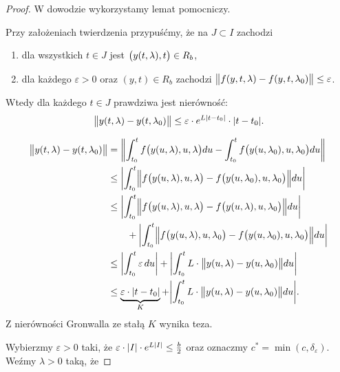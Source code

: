 \begin{proof}
  W dowodzie wykorzystamy lemat pomocniczy.
%
  \begin{nestedlemma} \label{L: Kluczowy}
%
    Przy założeniach twierdzenia przypuśćmy, że na $J \subset I$ zachodzi
%
    \begin{enumerate}
      \item dla wszystkich $t \in J$ jest $\p[\big]{y(t,\lambda),t} \in R_b$,
      \item dla każdego $\varepsilon > 0$ oraz $(y,t) \in R_b$ zachodzi
      $ \norm[\big]{ f(y,t,\lambda) - f(y,t,\lambda_0) } \leq \varepsilon $.
    \end{enumerate}
%
    Wtedy dla każdego $t \in J$ prawdziwa jest nierówność:
%
    \begin{equation*}
      \norm[\big]{ y(t,\lambda) - y(t,\lambda_0) } \leq \varepsilon \cdot e^{L \abs{t-t_0}} \cdot \abs{t-t_0}.
    \end{equation*}
%
  \end{nestedlemma}
%
  \begin{nestedproof}
%
    \begin{align*}
      \norm[\big]{ y(t,\lambda) - y(t,\lambda_0) }
      &= \norm*{ \int_{t_0}^t f \p[\big]{ y(u, \lambda), u, \lambda } du - 
          \int_{t_0}^t f\p[\big]{ y(u,\lambda_0), u, \lambda_0 } du} \\
      &\leq \abs*{ \int_{t_0}^t \norm[\Big]{ f \p[\big]{ y(u,\lambda), u, \lambda } - 
          f\p[\big]{ y(u,\lambda_0), u, \lambda_0 } } du } \\
      &\leq \abs*{ \int_{t_0}^t \norm[\Big]{ f \p[\big]{ y(u,\lambda), u, \lambda } - 
          f\p[\big]{ y(u,\lambda), u, \lambda_0 } } du } \\
      &\qquad+ \abs*{ \int_{t_0}^t \norm[\Big]{ f \p[\big]{ y(u,\lambda), u, \lambda_0 } - 
          f\p[\big]{ y(u,\lambda_0), u, \lambda_0 } } du } \\
      &\leq \abs*{\int_{t_0}^t \varepsilon \, du} + 
          \abs*{ \int_{t_0}^t L \cdot \norm[\big]{ y(u,\lambda) - y(u,\lambda_0) } du } \\
      &\leq \underbrace{\varepsilon \cdot \abs*{t-t_0}}_K + 
          \abs*{ \int_{t_0}^t L \cdot \norm[\big]{ y(u,\lambda) - y(u,\lambda_0) } du }.
    \end{align*}
%
    Z nierówności Gronwalla ze stałą $K$ wynika teza.
%
  \end{nestedproof}
%
  Wybierzmy $\varepsilon > 0$ taki, że 
  $\varepsilon \cdot \abs{I} \cdot e^{L \abs{I}} \leq \frac b2$
  oraz oznaczmy $c^{\ast} = \min(c,\delta_{\varepsilon})$. Weźmy $\lambda > 0$ taką, że

\end{proof}
